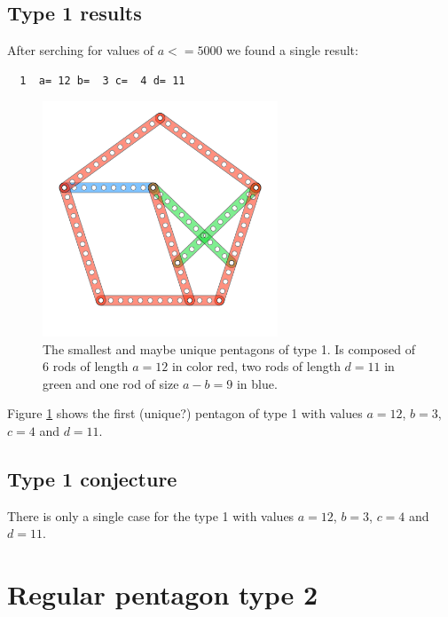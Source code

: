 \documentclass[11pt]{article}
\begin{document}
\subsection{Type 1 results}
After serching for values of $a <= 5000$ we found a single result:

\begin{lstlisting}
  1  a= 12 b=  3 c=  4 d= 11
\end{lstlisting}

\begin{figure}
\centering
\includegraphics[width=7cm]{figs/pentagon-12a}
\caption{The smallest and maybe unique pentagons of type 1.
Is composed of 6 rods of length $a = 12$ in color red,
two rods of length $d=11$ in green and one rod of size $a-b = 9$ in blue.}
\label{pentagon-12a}
\end{figure}

Figure \ref{pentagon-12a} shows the first (unique?) pentagon of type 1 with values
$a=12$, $b=3$, $c=4$ and $d=11$.

\subsection{Type 1 conjecture}
There is only a single case for the type 1 with values $a=12$, $b=3$, $c=4$ and $d=11$.


\section{Regular pentagon type 2}
\end{document}
